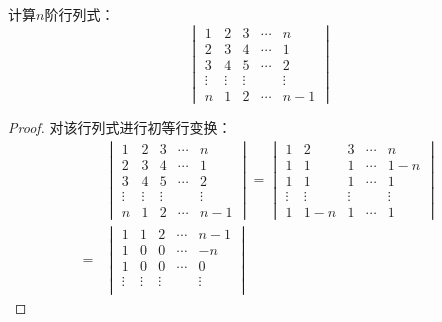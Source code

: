 \begin{problem}
计算\(n\)阶行列式：
\begin{equation*}
    \begin{vmatrix}
        1      & 2      & 3      & \cdots & n      \\
        2      & 3      & 4      & \cdots & 1      \\
        3      & 4      & 5      & \cdots & 2      \\
        \vdots & \vdots & \vdots &        & \vdots \\
        n      & 1      & 2      & \cdots & n-1
    \end{vmatrix}
\end{equation*}
\end{problem}
\begin{proof}
    对该行列式进行初等行变换：
    \begin{align*}
          &
        \begin{vmatrix}
            1      & 2      & 3      & \cdots & n      \\
            2      & 3      & 4      & \cdots & 1      \\
            3      & 4      & 5      & \cdots & 2      \\
            \vdots & \vdots & \vdots &        & \vdots \\
            n      & 1      & 2      & \cdots & n-1
        \end{vmatrix}=
        \begin{vmatrix}
            1      & 2      & 3      & \cdots & n      \\
            1      & 1      & 1      & \cdots & 1-n    \\
            1      & 1      & 1      & \cdots & 1      \\
            \vdots & \vdots & \vdots &        & \vdots \\
            1      & 1-n    & 1      & \cdots & 1
        \end{vmatrix}                                                                           \\
        = &
        \begin{vmatrix}
            1      & 1      & 2      & \cdots & n-1    \\
            1      & 0      & 0      & \cdots & -n     \\
            1      & 0      & 0      & \cdots & 0      \\
            \vdots & \vdots & \vdots &        & \vdots \\

\end{vmatrix}
\end{align*}
\end{proof}
